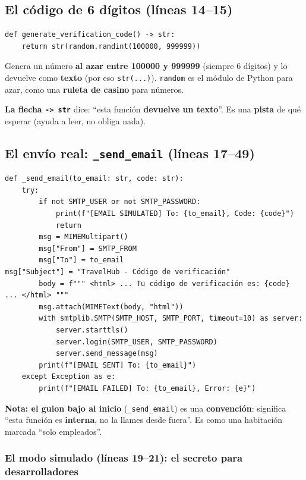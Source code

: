 \documentclass[11pt,a4paper]{article}
\begin{document}
\subsection{El código de 6 dígitos (líneas 14--15)}

\begin{lstlisting}
def generate_verification_code() -> str:
    return str(random.randint(100000, 999999))
\end{lstlisting}

Genera un número \textbf{al azar entre 100000 y 999999} (siempre 6 dígitos) y lo devuelve
como \textbf{texto} (por eso \texttt{str(...)}). \texttt{random} es el módulo de Python para
azar, como una \textbf{ruleta de casino} para números.

\textbf{La flecha \texttt{-> str} } dice: ``esta función \textbf{devuelve un texto}''. Es una
\textbf{pista} de qué esperar (ayuda a leer, no obliga nada).

\subsection{El envío real: \texttt{\_send\_email} (líneas 17--49)}

\begin{lstlisting}
def _send_email(to_email: str, code: str):
    try:
        if not SMTP_USER or not SMTP_PASSWORD:
            print(f"[EMAIL SIMULATED] To: {to_email}, Code: {code}")
            return
        msg = MIMEMultipart()
        msg["From"] = SMTP_FROM
        msg["To"] = to_email
msg["Subject"] = "TravelHub - Código de verificación"
        body = f""" <html> ... Tu código de verificación es: {code} ... </html> """
        msg.attach(MIMEText(body, "html"))
        with smtplib.SMTP(SMTP_HOST, SMTP_PORT, timeout=10) as server:
            server.starttls()
            server.login(SMTP_USER, SMTP_PASSWORD)
            server.send_message(msg)
        print(f"[EMAIL SENT] To: {to_email}")
    except Exception as e:
        print(f"[EMAIL FAILED] To: {to_email}, Error: {e}")
\end{lstlisting}

\textbf{Nota: el guion bajo al inicio} (\texttt{\_send\_email}) es una \textbf{convención}:
significa ``esta función es \textbf{interna}, no la llames desde fuera''. Es como una
habitación marcada ``solo empleados''.

\subsubsection{El modo simulado (líneas 19--21): el secreto para desarrolladores}
\end{document}
